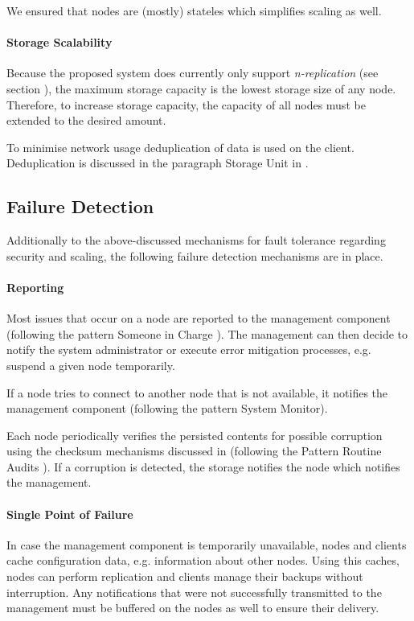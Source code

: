 We ensured that \glspl{node} are (mostly) stateles which simplifies scaling as well.

\paragraph{Storage Scalability} Because the proposed system does currently only support \emph{n-replication} (see section ), the maximum storage capacity is the lowest storage size of any \gls{node}. Therefore, to increase storage capacity, the capacity of all \glspl{node} must be extended to the desired amount.

To minimise network usage deduplication of data is used on the \gls{client}. Deduplication is  discussed in the paragraph Storage Unit in  .

\subsection{Failure Detection}

Additionally to the above-discussed mechanisms for fault tolerance regarding security and scaling, the following failure detection mechanisms are in place.

\paragraph{Reporting} Most issues that occur on a \gls{node} are reported to the \gls{management} component (following the pattern Someone in Charge \cite{fault-tolerance}). The \gls{management} can then decide to notify the system administrator or execute error mitigation processes, e.g. suspend a given \gls{node} temporarily.

If a \gls{node} tries to connect to another \gls{node} that is not available, it notifies the \gls{management} component (following the pattern System Monitor\cite{fault-tolerance}).

Each \gls{node} periodically verifies the persisted contents for possible corruption using the checksum mechanisms discussed in  (following the Pattern Routine Audits \cite{fault-tolerance}). If a corruption is detected, the \gls{storage} notifies the \gls{node} which notifies the \gls{management}.

\paragraph{Single Point of Failure} In case the \gls{management} component is temporarily unavailable, \glspl{node} and \glspl{client} cache configuration data, e.g. information about other \glspl{node}. Using this caches, \glspl{node} can perform replication and \glspl{client} manage their backups without interruption. Any notifications that were not successfully transmitted to the \gls{management} must be buffered on the \glspl{node} as well to ensure their delivery.

